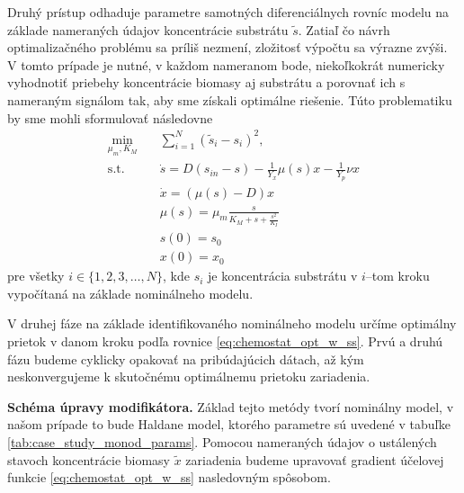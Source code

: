 Druhý prístup odhaduje parametre samotných diferenciálnych rovníc modelu na základe nameraných údajov koncentrácie substrátu $ \tilde{s} $. Zatiaľ čo návrh optimalizačného problému sa príliš nezmení, zložitosť výpočtu sa výrazne zvýši. V tomto prípade je nutné, v každom nameranom bode, niekoľkokrát numericky vyhodnotiť priebehy koncentrácie biomasy aj substrátu a porovnať ich s nameraným signálom  tak, aby sme získali optimálne riešenie. Túto problematiku by sme mohli sformulovať následovne
\begin{equation}
	\begin{split}
		\min_{\mu_{m},K_{M}} \quad & \sum_{i=1}^{N} \left(\tilde{s}_{i}-s_{i}\right)^2, \\
		\textrm{s.t.} \quad & \dot{s} = D(s_{in}-s)-\frac{1}{Y_x}\mu(s)x-\frac{1}{Y_p}\nu x \\
		& \dot{x} = (\mu(s)-D)x \\
		& \mu(s)=\mu_{m}\frac{s}{K_{M} + s + \frac{s^2}{K_{I}}} \\
		& s(0) = s_0 \\
		& x(0) = x_0
	\end{split}
\end{equation}
pre všetky $ i \in \lbrace 1,2,3,\dots,N \rbrace $, kde $ s_{i} $ je koncentrácia substrátu v $ i $--tom kroku vypočítaná na základe nominálneho modelu.

V druhej fáze na základe identifikovaného nominálneho modelu určíme optimálny prietok v danom kroku podľa rovnice \eqref{eq:chemostat_opt_w_ss}. Prvú a druhú fázu budeme cyklicky opakovať na pribúdajúcich dátach, až kým neskonvergujeme k skutočnému optimálnemu prietoku zariadenia.

\textbf{Schéma úpravy modifikátora.}
Základ tejto metódy tvorí nominálny model, v našom prípade to bude Haldane model, ktorého parametre sú uvedené v tabuľke \ref{tab:case_study_monod_params}. Pomocou nameraných údajov o ustálených stavoch koncentrácie biomasy $ \tilde{x} $ zariadenia budeme upravovať gradient účelovej funkcie \eqref{eq:chemostat_opt_w_ss} nasledovným spôsobom.


